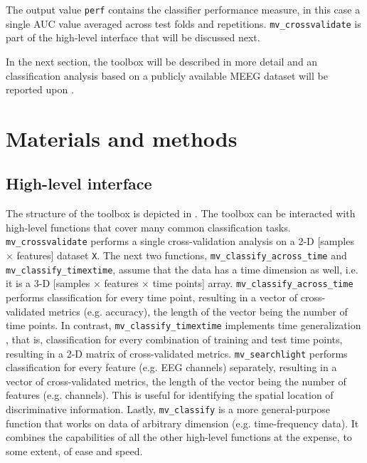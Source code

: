 \documentclass[utf8]{frontiersSCNS} %
\newcommand{\ttt}[1]{\texttt{#1}}
\begin{document}
The output value \ttt{perf} contains the classifier performance measure, in this case a single AUC value averaged across test folds and repetitions. \ttt{mv\_crossvalidate} is part of the high-level interface that will be discussed next.

In the next section, the toolbox will be described in more detail and an classification analysis based on a publicly available MEEG dataset will be reported upon \citep{Wakeman2015ADataset,Wakeman2014OpenfMRI}.

\section{Materials and methods}

\subsection{High-level interface}

The structure of the toolbox is depicted in . 
The toolbox can be interacted with high-level functions that cover many common classification tasks. \ttt{mv\_crossvalidate} performs a single cross-validation analysis on a 2-D [samples $\times$ features] dataset \ttt{X}. The next two functions, \ttt{mv\_classify\_across\_time}  and \ttt{mv\_classify\_timextime}, assume that the data has a time dimension as well, i.e. it is a 3-D [samples $\times$ features $\times$ time points] array. \ttt{mv\_classify\_across\_time} performs classification for every time point, resulting in a vector of cross-validated metrics (e.g. accuracy), the length of the vector being the number of time points. In contrast, \ttt{mv\_classify\_timextime} implements time generalization \citep{King2014}, that is, classification for every combination of training and test time points, resulting in a 2-D matrix of cross-validated metrics. \ttt{mv\_searchlight}  performs classification for every feature (e.g. EEG channels) separately, resulting in a vector of cross-validated metrics, the length of the vector being the number of features (e.g. channels). This is useful for identifying the spatial location of discriminative information. Lastly, \ttt{mv\_classify} is a more general-purpose function that works on data of arbitrary dimension (e.g. time-frequency data). It combines the capabilities of all the other high-level functions at the expense, to some extent, of ease and speed.
\end{document}
